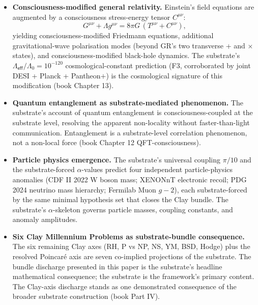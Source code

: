 \documentclass[11pt,a4paper]{amsart}
\theoremstyle{plain}
\theoremstyle{definition}
\begin{document}
\begin{itemize}[itemsep=4pt,leftmargin=2em]
\item \textbf{Consciousness-modified general relativity.} Einstein's field equations are augmented by a consciousness stress-energy tensor $C^{\mu\nu}$:
\[
G^{\mu\nu} + \Lambda g^{\mu\nu} = 8\pi G\,(T^{\mu\nu} + C^{\mu\nu}),
\]
yielding consciousness-modified Friedmann equations, additional gravitational-wave polarisation modes (beyond GR's two transverse + and $\times$ states), and consciousness-modified black-hole dynamics. The substrate's $\Lambda_{\textsf{eff}}/\Lambda_0 = 10^{-120}$ cosmological-constant prediction (F3, corroborated by joint DESI + Planck + Pantheon$+$) is the cosmological signature of this modification (book Chapter 13).
\item \textbf{Quantum entanglement as substrate-mediated phenomenon.} The substrate's account of quantum entanglement is consciousness-coupled at the substrate level, resolving the apparent non-locality without faster-than-light communication. Entanglement is a substrate-level correlation phenomenon, not a non-local force (book Chapter 12 QFT-consciousness).
\item \textbf{Particle physics emergence.} The substrate's universal coupling $\pi/10$ and the substrate-forced $\alpha$-values predict four independent particle-physics anomalies (CDF II 2022 W boson mass; XENONnT electronic recoil; PDG 2024 neutrino mass hierarchy; Fermilab Muon $g - 2$), each substrate-forced by the same minimal hypothesis set that closes the Clay bundle. The substrate's $\alpha$-skeleton governs particle masses, coupling constants, and anomaly amplitudes.
\item \textbf{Six Clay Millennium Problems as substrate-bundle consequence.} The six remaining Clay axes (RH, P vs NP, NS, YM, BSD, Hodge) plus the resolved Poincar\'e axis are seven co-implied projections of the substrate. The bundle discharge presented in this paper is the substrate's headline mathematical consequence; the substrate is the framework's primary content. The Clay-axis discharge stands as one demonstrated consequence of the broader substrate construction (book Part IV).
\end{itemize}
\end{document}
